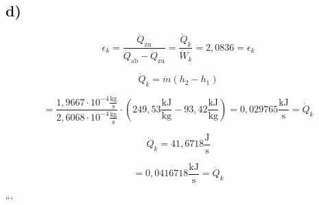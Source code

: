 

\subsection*{d)}
\[
\epsilon_k = \frac{\dot{Q}_{\text{zu}}}{\dot{Q}_{\text{ab}} - \dot{Q}_{\text{zu}}} = \frac{\dot{Q}_k}{\dot{W}_k} = 2,0836 = \epsilon_k
\]

\[
\dot{Q}_k = \dot{m} (h_2 - h_1)
\]

\[
= \frac{1,9667 \cdot 10^{-4} \frac{\text{kg}}{\text{s}}}{2,6068 \cdot 10^{-4} \frac{\text{kg}}{\text{s}}} \cdot (249,53 \frac{\text{kJ}}{\text{kg}} - 93,42 \frac{\text{kJ}}{\text{kg}}) = 0,029765 \frac{\text{kJ}}{\text{s}} = \dot{Q}_k
\]

\[
\dot{Q}_k = 41,6718 \frac{\text{J}}{\text{s}}
\]

\[
= 0,0416718 \frac{\text{kJ}}{\text{s}} = \dot{Q}_k
\]

```